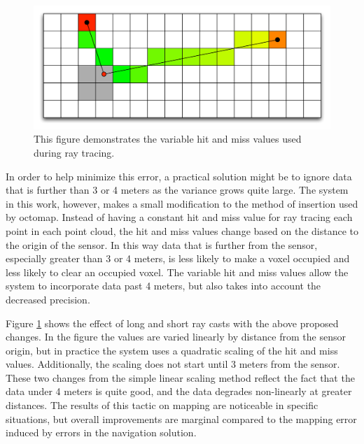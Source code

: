 \documentclass[12pt]{report}
\begin{document}
\begin{figure}[ht]
  \centering
  \includegraphics[width=6in,keepaspectratio]{variable_hit_miss.pdf}
  \caption{This figure demonstrates the variable hit and miss values used during ray tracing.}
  \label{fig:variable_hit_miss}
\end{figure}

In order to help minimize this error, a practical solution might be to ignore data that is further than 3 or 4 meters as the variance grows quite large.  The system in this work, however, makes a small modification to the method of insertion used by octomap.  Instead of having a constant hit and miss value for ray tracing each point in each point cloud, the hit and miss values change based on the distance to the origin of the sensor.  In this way data that is further from the sensor, especially greater than 3 or 4 meters, is less likely to make a voxel occupied and less likely to clear an occupied voxel.  The variable hit and miss values allow the system to incorporate data past 4 meters, but also takes into account the decreased precision.

Figure \ref{fig:variable_hit_miss} shows the effect of long and short ray casts with the above proposed changes.  In the figure the values are varied linearly by distance from the sensor origin, but in practice the system uses a quadratic scaling of the hit and miss values.  Additionally, the scaling does not start until 3 meters from the sensor.  These two changes from the simple linear scaling method reflect the fact that the data under 4 meters is quite good, and the data degrades non-linearly at greater distances.  The results of this tactic on mapping are noticeable in specific situations, but overall improvements are marginal compared to the mapping error induced by errors in the navigation solution.

\end{document}
